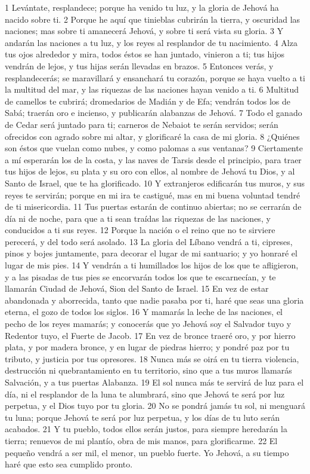 1 Levántate, resplandece; porque ha venido tu luz, y la gloria de Jehová ha nacido sobre ti.
2 Porque he aquí que tinieblas cubrirán la tierra, y oscuridad las naciones; mas sobre ti amanecerá Jehová, y sobre ti será vista su gloria.
3 Y andarán las naciones a tu luz, y los reyes al resplandor de tu nacimiento.
4 Alza tus ojos alrededor y mira, todos éstos se han juntado, vinieron a ti; tus hijos vendrán de lejos, y tus hijas serán llevadas en brazos.
5 Entonces verás, y resplandecerás; se maravillará y ensanchará tu corazón, porque se haya vuelto a ti la multitud del mar, y las riquezas de las naciones hayan venido a ti.
6 Multitud de camellos te cubrirá; dromedarios de Madián y de Efa; vendrán todos los de Sabá; traerán oro e incienso, y publicarán alabanzas de Jehová.
7 Todo el ganado de Cedar será juntado para ti; carneros de Nebaiot te serán servidos; serán ofrecidos con agrado sobre mi altar, y glorificaré la casa de mi gloria.
8 ¿Quiénes son éstos que vuelan como nubes, y como palomas a sus ventanas?
9 Ciertamente a mí esperarán los de la costa, y las naves de Tarsis desde el principio, para traer tus hijos de lejos, su plata y su oro con ellos, al nombre de Jehová tu Dios, y al Santo de Israel, que te ha glorificado.
10 Y extranjeros edificarán tus muros, y sus reyes te servirán; porque en mi ira te castigué, mas en mi buena voluntad tendré de ti misericordia.
11 Tus puertas estarán de continuo abiertas; no se cerrarán de día ni de noche, para que a ti sean traídas las riquezas de las naciones, y conducidos a ti sus reyes.
12 Porque la nación o el reino que no te sirviere perecerá, y del todo será asolado. 
13 La gloria del Líbano vendrá a ti, cipreses, pinos y bojes juntamente, para decorar el lugar de mi santuario; y yo honraré el lugar de mis pies.
14 Y vendrán a ti humillados los hijos de los que te afligieron, y a las pisadas de tus pies se encorvarán todos los que te escarnecían, y te llamarán Ciudad de Jehová, Sion del Santo de Israel.
15 En vez de estar abandonada y aborrecida, tanto que nadie pasaba por ti, haré que seas una gloria eterna, el gozo de todos los siglos.
16 Y mamarás la leche de las naciones, el pecho de los reyes mamarás; y conocerás que yo Jehová soy el Salvador tuyo y Redentor tuyo, el Fuerte de Jacob.
17 En vez de bronce traeré oro, y por hierro plata, y por madera bronce, y en lugar de piedras hierro; y pondré paz por tu tributo, y justicia por tus opresores.
18 Nunca más se oirá en tu tierra violencia, destrucción ni quebrantamiento en tu territorio, sino que a tus muros llamarás Salvación, y a tus puertas Alabanza.
19 El sol nunca más te servirá de luz para el día, ni el resplandor de la luna te alumbrará, sino que Jehová te será por luz perpetua, y el Dios tuyo por tu gloria. 
20 No se pondrá jamás tu sol, ni menguará tu luna; porque Jehová te será por luz perpetua, y los días de tu luto serán acabados.
21 Y tu pueblo, todos ellos serán justos, para siempre heredarán la tierra; renuevos de mi plantío, obra de mis manos, para glorificarme.
22 El pequeño vendrá a ser mil, el menor, un pueblo fuerte. Yo Jehová, a su tiempo haré que esto sea cumplido pronto.


